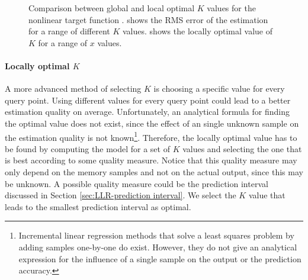 \begin{figure}[htbp]
	\centering
	\caption[Global versus local optimal $K$ value]{Comparison between global and local optimal $K$ values for the nonlinear target function .  shows the \ac{RMS} error of the estimation for a range of different $K$ values.  shows the locally optimal value of $K$ for a range of $x$ values.}
	\label{fig:LLR-nonlinfunction_K}
\end{figure}

\paragraph{Locally optimal $K$}
A more advanced method of selecting $K$ is choosing a specific value for every query point. Using different values for every query point could lead to a better estimation quality on average. Unfortunately, an analytical formula for finding the optimal value does not exist, since the effect of an single unknown sample on the estimation quality is not known\footnote{Incremental linear regression methods that solve a least squares problem by adding samples one-by-one do exist. However, they do not give an analytical expression for the influence of a single sample on the output or the prediction accuracy.}. Therefore, the locally optimal value has to be found by computing the model for a set of $K$ values and selecting the one that is best according to some quality measure. Notice that this quality measure may only depend on the memory samples and not on the actual output, since this may be unknown. A possible quality measure could be the prediction interval discussed in Section \ref{sec:LLR-prediction interval}. We select the $K$ value that leads to the smallest prediction interval as optimal.

